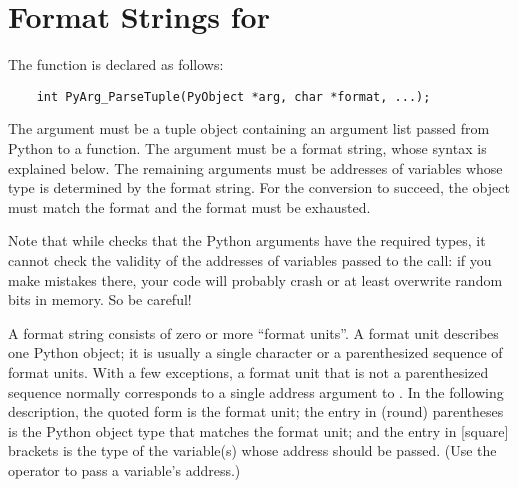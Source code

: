\documentclass[twoside,openright]{report}
\begin{document}
\section{Format Strings for }

The  function is declared as follows:

\bcode\begin{verbatim}
    int PyArg_ParseTuple(PyObject *arg, char *format, ...);
\end{verbatim}\ecode
%
The  argument must be a tuple object containing an argument
list passed from Python to a \C{} function.  The  argument
must be a format string, whose syntax is explained below.  The
remaining arguments must be addresses of variables whose type is
determined by the format string.  For the conversion to succeed, the
 object must match the format and the format must be
exhausted.

Note that while  checks that the Python
arguments have the required types, it cannot check the validity of the
addresses of \C{} variables passed to the call: if you make mistakes
there, your code will probably crash or at least overwrite random bits
in memory.  So be careful!

A format string consists of zero or more ``format units''.  A format
unit describes one Python object; it is usually a single character or
a parenthesized sequence of format units.  With a few exceptions, a
format unit that is not a parenthesized sequence normally corresponds
to a single address argument to .  In the
following description, the quoted form is the format unit; the entry
in (round) parentheses is the Python object type that matches the
format unit; and the entry in [square] brackets is the type of the \C{}
variable(s) whose address should be passed.  (Use the \samp{\&}
operator to pass a variable's address.)
\end{document}
